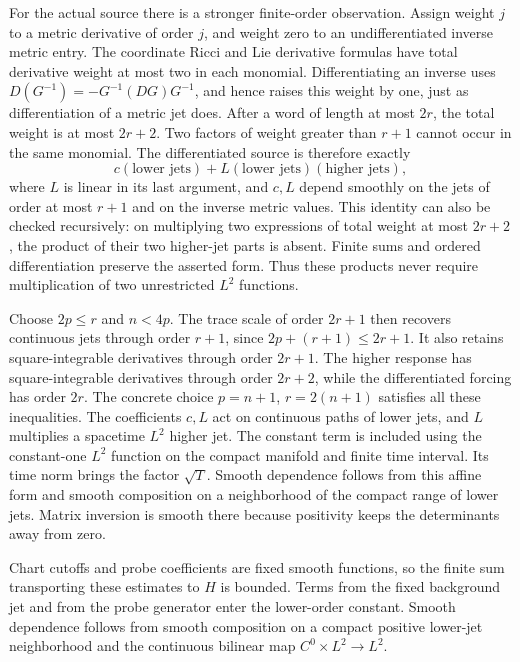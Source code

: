For the actual source there is a stronger finite-order observation.
Assign weight $j$ to a metric derivative of order $j$, and weight zero
to an undifferentiated inverse metric entry.  The coordinate Ricci and
Lie derivative formulas have total derivative weight at most two in
each monomial.  Differentiating an inverse uses
$D(G^{-1})=-G^{-1}(DG)G^{-1}$, and hence raises this weight by one,
just as differentiation of a metric jet does.  After a word of length
at most $2r$, the total weight is at most $2r+2$.  Two factors of
weight greater than $r+1$ cannot occur in the same monomial.  The
differentiated source is therefore exactly
\[
 c(\text{lower jets})+
       L(\text{lower jets})(\text{higher jets}),
\]
where $L$ is linear in its last argument, and $c,L$ depend smoothly on
the jets of order at most $r+1$ and on the inverse metric values.
This identity can also be checked recursively: on multiplying two
expressions of total weight at most $2r+2$, the product of their two
higher-jet parts is absent.  Finite sums and ordered differentiation
preserve the asserted form.  Thus these products never require
multiplication of two unrestricted $L^2$ functions.

Choose $2p\leq r$ and $n<4p$.  The trace scale of order $2r+1$
then recovers continuous jets through order $r+1$, since
$2p+(r+1)\leq2r+1$.  It also retains square-integrable derivatives
through order $2r+1$.  The higher response has square-integrable
derivatives through order $2r+2$, while the differentiated forcing has
order $2r$.  The concrete choice $p=n+1$, $r=2(n+1)$ satisfies all
these inequalities.  The coefficients $c,L$ act on continuous paths
of lower jets, and $L$ multiplies a spacetime $L^2$ higher jet.  The
constant term is included using the constant-one $L^2$ function on
the compact manifold and finite time interval.  Its time norm brings
the factor $\sqrt T$.  Smooth dependence follows from this affine
form and smooth composition on a neighborhood of the compact range
of lower jets.  Matrix inversion is smooth there because positivity
keeps the determinants away from zero.

Chart cutoffs and probe coefficients are fixed smooth
functions, so the finite sum transporting these estimates to $H$ is
bounded.  Terms from the fixed background jet and from the probe
generator enter the lower-order constant.  Smooth dependence follows
from smooth composition on a compact positive lower-jet neighborhood
and the continuous bilinear map $C^0\times L^2\to L^2$.

